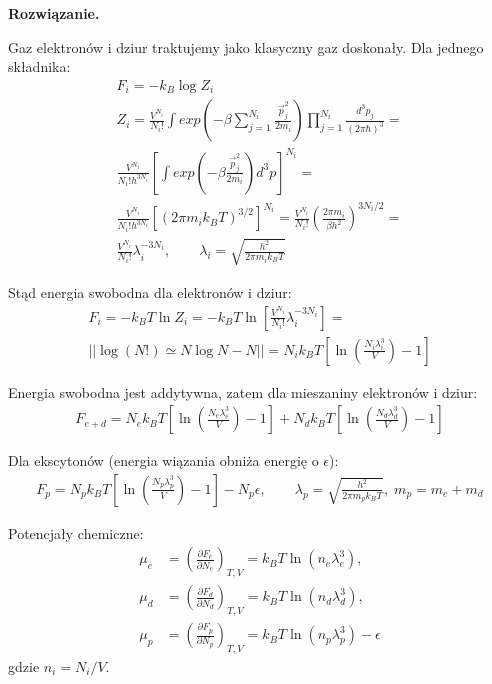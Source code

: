 \documentclass[11pt,a4paper]{article}
\newcommand{\Partial}[3]{\left( \frac{\partial #1}{\partial #2} \right)_{#3}}
\newenvironment{solution}{\vspace{1cm} \par\textbf{Rozwiązanie.} \vspace{1cm}}{}
\begin{document}
\begin{solution}

Gaz elektronów i dziur traktujemy jako klasyczny gaz doskonały. Dla jednego składnika:
\begin{align*}
  F_i = -k_B \log Z_{i} \\
  Z_{i} = \frac{V^{N_i}}{N_i!} \int exp(-\beta \sum_{j=1}^{N_i} \frac{\vec{p}_j^2}{2 m_i}) \prod_{j=1}^{N_i} \frac{d^3 p_j}{(2\pi\hbar)^3} = \\
  \frac{V^{N_i}}{N_i! h^{3N_i}} \left[\int exp(-\beta \frac{\vec{p}_j^2}{2 m_i}) d^3 p \right]^{N_i} = \\
    \frac{V^{N_i}}{N_i! h^{3N_i}} \left[ (2\pi m_i k_B T)^{3/2} \right]^{N_i} = 
     \frac{V^{N_i}}{N_i!} \left( \frac{2\pi m_i}{\beta h^2} \right)^{3N_i/2} = \\
      \frac{V^{N_i}}{N_i!} \lambda_i^{-3N_i}, \qquad \lambda_i = \sqrt{\frac{h^2}{2\pi m_i k_B T}}
\end{align*}

Stąd energia swobodna dla elektronów i dziur:
\begin{align*}
  F_i = -k_B T \ln Z_i = -k_B T \ln \left[ \frac{V^{N_i}}{N_i!} \lambda_i^{-3N_i} \right] = \\
  || \log(N!) \simeq N \log N - N || =
  N_i k_B T \left[ \ln\left( \frac{N_i \lambda_i^3}{V} \right) - 1 \right]
\end{align*}


Energia swobodna jest addytywna, zatem dla mieszaniny elektronów i dziur:
\begin{align*}
  F_{e+d} = N_{e} k_B T \left[\ln\left(\frac{N_e\lambda_e^3}{V}\right)-1\right]
  + N_{d} k_B T \left[\ln\left(\frac{N_d\lambda_d^3}{V}\right)-1\right]
\end{align*}

Dla ekscytonów (energia wiązania obniża energię o $\epsilon$):
\begin{align*}
  F_p = N_p k_B T \left[\ln\left(\frac{N_p\lambda_p^3}{V}\right)-1\right] - N_p\epsilon,
  \qquad
  \lambda_p = \sqrt{\frac{h^2}{2\pi m_p k_B T}},\; m_p=m_e+m_d
\end{align*}

Potencjały chemiczne:
\begin{align*}
  \mu_e &= \Partial{F_e}{N_e}{T,V} = k_B T\ln(n_e\lambda_e^3), \\
  \mu_d &= \Partial{F_d}{N_d}{T,V} = k_B T\ln(n_d\lambda_d^3), \\
  \mu_p &= \Partial{F_p}{N_p}{T,V} = k_B T\ln(n_p\lambda_p^3)-\epsilon
\end{align*}
gdzie $n_i = N_i/V$.


\end{solution}
\end{document}
